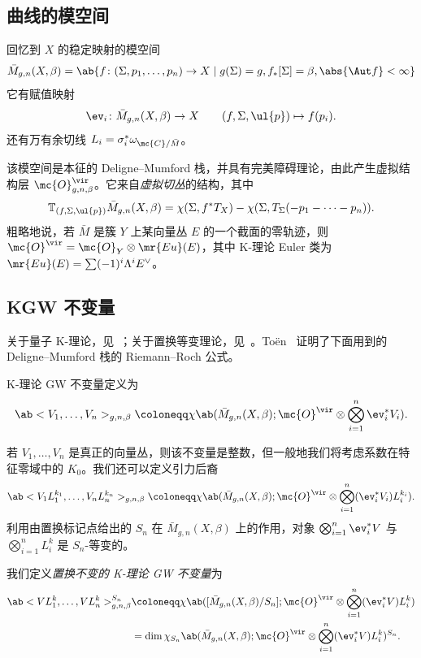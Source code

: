 \subsection{曲线的模空间}%
\label{sub:Moduli of curves}

回忆到 \(X\) 的稳定映射的模空间
\[ \bar{M}_{g,n}(X, \beta) = \ab\{ f \colon (\Sigma, p_1, \ldots, p_n) \to X \mid g(\Sigma) = g, f_*[\Sigma] = \beta, \abs{\Aut f} < \infty \} \]
它有赋值映射
\[ \ev_i \colon \bar{M}_{g,n}(X, \beta) \to X \qquad (f, \Sigma, \ul{p}) \mapsto f(p_i). \]
还有万有余切线 \(L_i = \sigma_i^* \omega_{ \mc{C}/\bar{M} }\)。

该模空间是本征的 Deligne–Mumford 栈，并具有完美障碍理论，由此产生虚拟结构层 \(\mc{O}^{\vir}_{g,n,\beta}\)。它来自\textit{虚拟切丛}的结构，其中
\[ \mathbb{T}_{(f, \Sigma, \ul{p})} \bar{M}_{g,n}(X, \beta) = \chi(\Sigma, f^* T_X) - \chi(\Sigma, T_{\Sigma}(-p_1 - \cdots - p_n)). \]
粗略地说，若 \(\bar{M}\) 是簇 \(Y\) 上某向量丛 \(E\) 的一个截面的零轨迹，则 \(\mc{O}^{\vir} = \mc{O}_Y \otimes \mr{Eu}(E)\)，其中 K-理论 Euler 类为 \(\mr{Eu}(E) = \sum (-1)^i \Lambda^i E^{\vee}\)。

\subsection{KGW 不变量}%
\label{sub:KGW invariants}

关于量子 K-理论，见~\cite{Lee2004}；关于置换等变理论，见~\cite{Givental2017K1,GiventalK7}。To\"en~\cite{Toen1999} 证明了下面用到的 Deligne–Mumford 栈的 Riemann–Roch 公式。

\begin{defn}
    K-理论 GW 不变量定义为
    \[ \ab<V_1, \ldots, V_n>_{g,n,\beta} \coloneqq \chi\ab(\bar{M}_{g,n}(X, \beta); \mc{O}^{\vir} \otimes \bigotimes_{i=1}^n \ev_i^* V_i). \]
\end{defn}

若 \(V_1, \ldots, V_n\) 是真正的向量丛，则该不变量是整数，但一般地我们将考虑系数在特征零域中的 \(K_0\)。我们还可以定义引力后裔
\[ \ab<V_1 L_1^{k_1}, \ldots, V_n L_n^{k_n}>_{g,n,\beta} \coloneqq \chi\ab(\bar{M}_{g,n}(X, \beta); \mc{O}^{\vir} \otimes \bigotimes_{i=1}^n ( \ev_i^* V_i )L_i^{k_i} ). \]
利用由置换标记点给出的 \(S_n\) 在 \(\bar{M}_{g,n}(X, \beta)\) 上的作用，对象 \(\bigotimes_{i=1}^n \ev_i^* V\) 与 \(\bigotimes_{i=1}^n L_i^k\) 是 \(S_n\)-等变的。

\begin{defn}
    我们定义\textit{置换不变的 K-理论 GW 不变量}为
    \begin{align*}
        \ab<V L_1^k, \ldots, V L_n^k>_{g,n,\beta}^{S_n} &\coloneqq \chi\ab([ \bar{M}_{g,n}(X, \beta)/S_n ]; \mc{O}^{\vir} \otimes \bigotimes_{i=1}^n ( \ev_i^* V ) L_i^k) \\
        &= \dim \chi_{S_n} \ab(\bar{M}_{g,n}(X, \beta); \mc{O}^{\vir} \otimes \bigotimes_{i=1}^n ( \ev_i^* V ) L_i^k )^{S_n}.
    \end{align*}
\end{defn}

